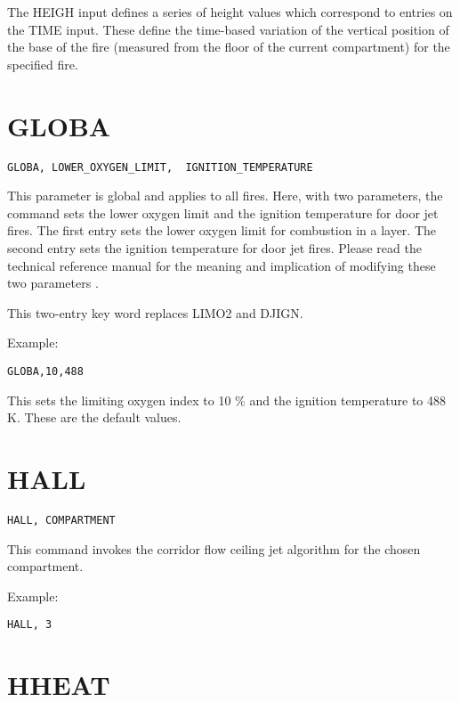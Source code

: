 The HEIGH input defines a series of height values which correspond to entries on the TIME input.  These define the time-based variation of the vertical position of the base of the fire (measured from the floor of the current compartment) for the specified fire.

\section{GLOBA}

\begin{lstlisting}
GLOBA, LOWER_OXYGEN_LIMIT,  IGNITION_TEMPERATURE
\end{lstlisting}

This parameter is global and applies to all fires. Here, with two parameters, the command sets the lower oxygen limit and the ignition temperature for door jet fires. The first entry sets the lower oxygen limit for combustion in a layer. The second entry sets the ignition temperature for door jet fires. Please read the technical reference manual for the meaning and implication of modifying these two parameters \cite{CFAST_Tech_Guide_7}.

This two-entry key word replaces LIMO2 and DJIGN.

Example:

\begin{lstlisting}
GLOBA,10,488
\end{lstlisting}

This sets the limiting oxygen index to 10 \% and the ignition temperature to 488 K. These are the default values.

\section{HALL}

\begin{lstlisting}
HALL, COMPARTMENT
\end{lstlisting}

This command invokes the corridor flow ceiling jet algorithm for the chosen compartment.

Example:

\begin{lstlisting}
HALL, 3
\end{lstlisting}

\section{HHEAT}


